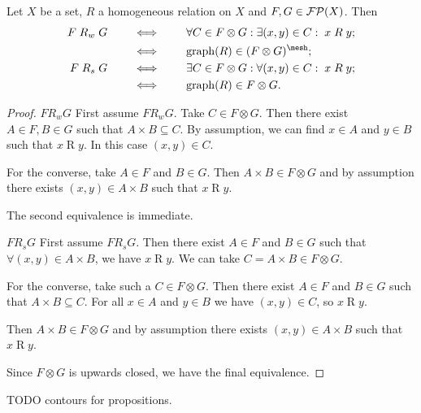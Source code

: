 \begin{lemma} \label{relationsOnFiltersRestated}
Let $X$ be a set, $R$ a homogeneous relation on $X$ and $F,G\in\operatorname{\mathcal{FP}}(X)$. Then
\begin{align*}
F \mathrel{R_w} G \qquad &\iff\qquad \forall C\in F\otimes G: \exists (x,y) \in C: \; x \mathrel{R} y; \\
&\iff\qquad \graph(R) \in (F\otimes G)^\mesh; \\
F \mathrel{R_s} G \qquad &\iff\qquad \exists C\in F\otimes G: \forall (x,y) \in C: \; x \mathrel{R} y; \\
&\iff\qquad \graph(R) \in F\otimes G.
\end{align*}
\end{lemma}
\begin{proof}
$\boxed{F \mathrel{R_w} G}$ First assume $F \mathrel{R_w} G$. Take $C\in F\otimes G$. Then there exist $A\in F, B\in G$ such that $A\times B \subseteq C$. By assumption, we can find $x\in A$ and $y\in B$ such that $x \mathrel{R} y$. In this case $(x,y)\in C$.

For the converse, take $A\in F$ and $B\in G$. Then $A\times B\in F\otimes G$ and by assumption there exists $(x,y)\in A\times B$ such that $x \mathrel{R} y$.

The second equivalence is immediate.

$\boxed{F \mathrel{R_s} G}$ First assume $F \mathrel{R_s} G$. Then there exist $A\in F$ and $B\in G$
such that $\forall (x,y) \in A\times B$, we have $ x \mathrel{R} y$. We can take $C = A\times B \in F\otimes G$.

For the converse, take such a $C\in F\otimes G$. Then there exist $A\in F$ and $B\in G$ such that $A\times B \subseteq C$. For all $x\in A$ and $y\in B$ we have $(x,y)\in C$, so $x\mathrel{R}y$.

Then $A\times B\in F\otimes G$ and by assumption there exists $(x,y)\in A\times B$ such that $x \mathrel{R} y$.

Since $F\otimes G$ is upwards closed, we have the final equivalence.
\end{proof}
TODO contours for propositions.


